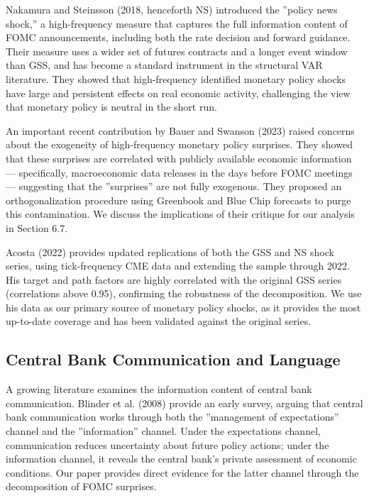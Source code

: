 \documentclass[12pt]{article}
\begin{document}
Nakamura and Steinsson (2018, henceforth NS) introduced the ''policy news shock,'' a high-frequency measure that captures the full information content of FOMC announcements, including both the rate decision and forward guidance. Their measure uses a wider set of futures contracts and a longer event window than GSS, and has become a standard instrument in the structural VAR literature. They showed that high-frequency identified monetary policy shocks have large and persistent effects on real economic activity, challenging the view that monetary policy is neutral in the short run.

An important recent contribution by Bauer and Swanson (2023) raised concerns about the exogeneity of high-frequency monetary policy surprises. They showed that these surprises are correlated with publicly available economic information --- specifically, macroeconomic data releases in the days before FOMC meetings --- suggesting that the ''surprises'' are not fully exogenous. They proposed an orthogonalization procedure using Greenbook and Blue Chip forecasts to purge this contamination. We discuss the implications of their critique for our analysis in Section 6.7.

Acosta (2022) provides updated replications of both the GSS and NS shock series, using tick-frequency CME data and extending the sample through 2022. His target and path factors are highly correlated with the original GSS series (correlations above 0.95), confirming the robustness of the decomposition. We use his data as our primary source of monetary policy shocks, as it provides the most up-to-date coverage and has been validated against the original series.

\subsection{Central Bank Communication and Language}

A growing literature examines the information content of central bank communication. Blinder et al. (2008) provide an early survey, arguing that central bank communication works through both the ''management of expectations'' channel and the ''information'' channel. Under the expectations channel, communication reduces uncertainty about future policy actions; under the information channel, it reveals the central bank's private assessment of economic conditions. Our paper provides direct evidence for the latter channel through the decomposition of FOMC surprises.
\end{document}
